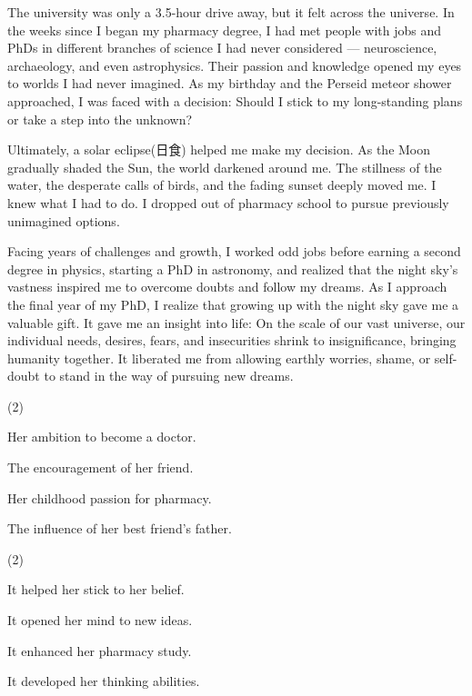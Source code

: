\documentclass{英语试卷}
\begin{document}
\par The university was only a 3.5-hour drive away, but it felt across the universe. In the weeks since I began my pharmacy degree, I had met people with jobs and PhDs in different branches of science I had never considered — neuroscience, archaeology, and even astrophysics. Their passion and knowledge opened my eyes to worlds I had never imagined. As my birthday and the Perseid meteor shower approached, I was faced with a decision: Should I stick to my long-standing plans or take a step into the unknown?\par
\par Ultimately, a solar eclipse(日食) helped me make my decision. As the Moon gradually shaded the Sun, the world darkened around me. The stillness of the water, the desperate calls of birds, and the fading sunset deeply moved me. I knew what I had to do. I dropped out of pharmacy school to pursue previously unimagined options.\par
\par Facing years of challenges and growth, I worked odd jobs before earning a second degree in physics, starting a PhD in astronomy, and realized that the night sky's vastness inspired me to overcome doubts and follow my dreams. As I approach the final year of my PhD, I realize that growing up with the night sky gave me a valuable gift. It gave me an insight into life: On the scale of our vast universe, our individual needs, desires, fears, and insecurities shrink to insignificance, bringing humanity together. It liberated me from allowing earthly worries, shame, or self-doubt to stand in the way of pursuing new dreams.\par
{}
\begin{choices}(2)
  \item Her ambition to become a doctor.
  \item The encouragement of her friend.
  \item Her childhood passion for pharmacy.
  \item The influence of her best friend's father.
\end{choices}
\begin{choices}(2)
  \item It helped her stick to her belief.
  \item It opened her mind to new ideas.
  \item It enhanced her pharmacy study.
  \item It developed her thinking abilities.
\end{choices}
\end{document}
